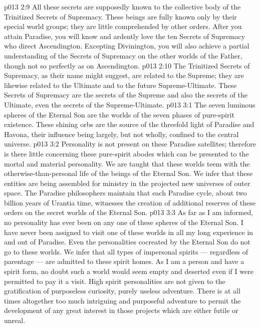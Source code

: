 \vs p013 2:9 \pc All these secrets are supposedly known to the collective body of the Trinitized Secrets of Supremacy. These beings are fully known only by their special world groups; they are little comprehended by other orders. After you attain Paradise, you will know and ardently love the ten Secrets of Supremacy who direct Ascendington. Excepting Divinington, you will also achieve a partial understanding of the Secrets of Supremacy on the other worlds of the Father, though not so perfectly as on Ascendington.
\vs p013 2:10 The Trinitized Secrets of Supremacy, as their name might suggest, are related to the Supreme; they are likewise related to the Ultimate and to the future Supreme\hyp{}Ultimate. These Secrets of Supremacy are the secrets of the Supreme and also the secrets of the Ultimate, even the secrets of the Supreme\hyp{}Ultimate.
\vs p013 3:1 The seven luminous spheres of the Eternal Son are the worlds of the seven phases of pure\hyp{}spirit existence. These shining orbs are the source of the threefold light of Paradise and Havona, their influence being largely, but not wholly, confined to the central universe.
\vs p013 3:2 Personality is not present on these Paradise satellites; therefore is there little concerning these pure\hyp{}spirit abodes which can be presented to the mortal and material personality. We are taught that these worlds teem with the otherwise\hyp{}than\hyp{}personal life of the beings of the Eternal Son. We infer that these entities are being assembled for ministry in the projected new universes of outer space. The Paradise philosophers maintain that each Paradise cycle, about two billion years of Urantia time, witnesses the creation of additional reserves of these orders on the secret worlds of the Eternal Son.
\vs p013 3:3 \pc As far as I am informed, no personality has ever been on any one of these spheres of the Eternal Son. I have never been assigned to visit one of these worlds in all my long experience in and out of Paradise. Even the personalities cocreated by the Eternal Son do not go to these worlds. We infer that all types of impersonal spirits --- regardless of parentage --- are admitted to these spirit homes. As I am a person and have a spirit form, no doubt such a world would seem empty and deserted even if I were permitted to pay it a visit. High spirit personalities are not given to the gratification of purposeless curiosity, purely useless adventure. There is at all times altogether too much intriguing and purposeful adventure to permit the development of any great interest in those projects which are either futile or unreal.
